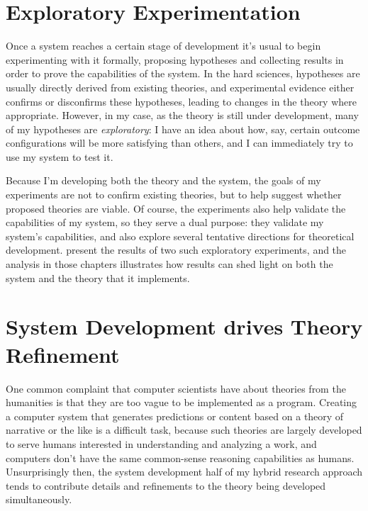 \section{Exploratory Experimentation}

Once a system reaches a certain stage of development it's usual to begin experimenting with it formally, proposing hypotheses and collecting results in order to prove the capabilities of the system.
%
In the hard sciences, hypotheses are usually directly derived from existing theories, and experimental evidence either confirms or disconfirms these hypotheses, leading to changes in the theory where appropriate.
%
However, in my case, as the theory is still under development, many of my hypotheses are \emph{exploratory}: I have an idea about how, say, certain outcome configurations will be more satisfying than others, and I can immediately try to use my system to test it.


Because I'm developing both the theory and the system, the goals of my experiments are not to confirm existing theories, but to help suggest whether proposed theories are viable.
%
Of course, the experiments also help validate the capabilities of my system, so they serve a dual purpose: they validate my system's capabilities, and also explore several tentative directions for theoretical development.
%
 present the results of two such exploratory experiments, and the analysis in those chapters illustrates how results can shed light on both the system and the theory that it implements.


\section{System Development drives Theory Refinement}


One common complaint that computer scientists have about theories from the humanities is that they are too vague to be implemented as a program.
%
Creating a computer system that generates predictions or content based on a theory of narrative or the like is a difficult task, because such theories are largely developed to serve humans interested in understanding and analyzing a work, and computers don't have the same common-sense reasoning capabilities as humans.
%
Unsurprisingly then, the system development half of my hybrid research approach tends to contribute details and refinements to the theory being developed simultaneously.


